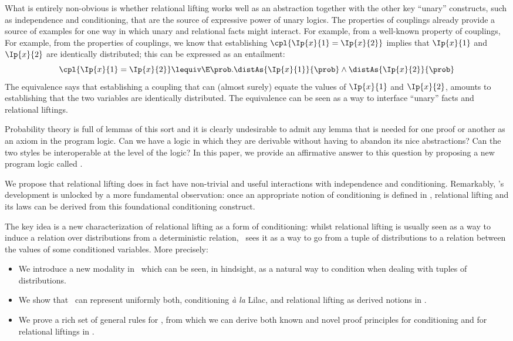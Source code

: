 \documentclass[acmsmall,nonacm,screen,appendix]{acmart}
\begin{document}
What is entirely non-obvious is whether relational lifting
works well as an abstraction together with the other key ``unary'' constructs,
such as independence and conditioning,
that are the source of expressive power of unary logics.
\ifappendix The properties of couplings already provide a source of examples
for one way in which unary and relational facts might interact.
For example, from a well-known property of couplings,
\else
For example, from the properties of couplings,
\fi we know that establishing $\cpl{\Ip{x}{1} = \Ip{x}{2}}$ implies that
$\Ip{x}{1}$ and $\Ip{x}{2}$ are identically distributed;
this can be expressed as an entailment:
\begin{equation}
  \cpl{\Ip{x}{1} = \Ip{x}{2}}
  \lequiv
  \E \prob.
    \distAs{\Ip{x}{1}}{\prob}
    \land
    \distAs{\Ip{x}{2}}{\prob}
  \label{eq:rl-id-conv}
\end{equation}
The equivalence says that establishing a coupling that can
(almost surely) equate the values of $\Ip{x}{1}$ and $\Ip{x}{2}$,
amounts to establishing that the two variables are identically distributed.
The equivalence can be seen as a way to interface ``unary'' facts
and relational liftings.


Probability theory is full of lemmas of this sort and it is clearly undesirable to admit any lemma that is needed for one proof or another as an axiom in the program logic.
Can we have a logic in which they are derivable without having to abandon its nice abstractions?
Can the two styles be interoperable at the level of the logic?
In this paper, we provide an affirmative answer to this question by proposing a new program logic called \thelogic.


We propose that relational lifting does in fact have non-trivial and useful
interactions with independence and conditioning.
Remarkably, \thelogic's development is unlocked by
a more fundamental observation:
once an appropriate notion of conditioning is defined in \thelogic,
relational lifting and its laws can be derived from this foundational
conditioning construct.


The key idea is a new characterization of relational lifting as a form of
conditioning:
whilst relational lifting is usually seen as a way to induce a relation over distributions from a deterministic relation,
\thelogic\ sees it as a way to go from
a tuple of distributions to a relation between the values of some conditioned variables.
More precisely:
\begin{itemize}
  \item
    We introduce a new \emph{\supercond} modality in \thelogic\
    which can be seen, in hindsight,
    as a natural way to condition when dealing with tuples of distributions.
  \item
    We show that \supercond\ can represent uniformly
    both, conditioning \emph{à la} Lilac,
    and relational lifting as derived notions in \thelogic.
  \item
    We prove a rich set of general rules for \supercond,
    from which we can derive both known and novel proof principles
    for conditioning and for relational liftings in \thelogic.
\end{itemize}
\end{document}
